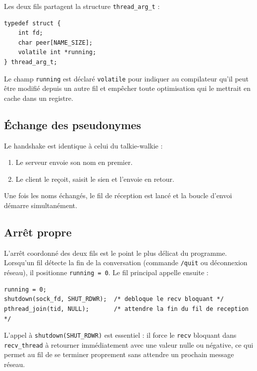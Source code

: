 \documentclass[12pt,a4paper]{article}
\begin{document}
Les deux fils partagent la structure \texttt{thread\_arg\_t} :

\begin{lstlisting}[caption={Structure partagée entre les deux fils}]
typedef struct {
    int fd;
    char peer[NAME_SIZE];
    volatile int *running;
} thread_arg_t;
\end{lstlisting}

Le champ \texttt{running} est déclaré \texttt{volatile} pour indiquer au
compilateur qu'il peut être modifié depuis un autre fil et empêcher toute
optimisation qui le mettrait en cache dans un registre.

\subsection{Échange des pseudonymes}

Le handshake est identique à celui du talkie-walkie :

\begin{enumerate}
    \item Le serveur envoie son nom en premier.
    \item Le client le reçoit, saisit le sien et l'envoie en retour.
\end{enumerate}

Une fois les noms échangés, le fil de réception est lancé et la boucle
d'envoi démarre simultanément.

\subsection{Arrêt propre}

L'arrêt coordonné des deux fils est le point le plus délicat du programme.
Lorsqu'un fil détecte la fin de la conversation (commande \texttt{/quit} ou
déconnexion réseau), il positionne \texttt{running = 0}. Le fil principal
appelle ensuite :

\begin{lstlisting}[caption={Séquence d'arrêt}]
running = 0;
shutdown(sock_fd, SHUT_RDWR);  /* debloque le recv bloquant */
pthread_join(tid, NULL);       /* attendre la fin du fil de reception */
\end{lstlisting}

L'appel à \texttt{shutdown(SHUT\_RDWR)} est essentiel : il force le
\texttt{recv} bloquant dans \texttt{recv\_thread} à retourner immédiatement
avec une valeur nulle ou négative, ce qui permet au fil de se terminer
proprement sans attendre un prochain message réseau.
\end{document}
